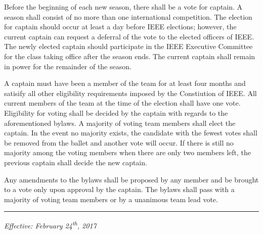 \documentclass[12pt]{constitution}
\begin{document}
\label{art:elect}

Before the beginning of each new season, there shall be a vote for captain. A season shall consist of no more than one international competition. The election for captain should occur at least a day before IEEE elections; however, the current captain can request a deferral of the vote to the elected officers of IEEE. The newly elected captain should participate in the IEEE Executive Committee for the class taking office after the season ends. The current captain shall remain in power for the remainder of the season.

A captain must have been a member of the team for at least four months and satisify all other eligibility requirements imposed by the Constiution of IEEE. All current members of the team at the time of the election shall have one vote. Eligibility for voting shall be decided by the captain with regards to the aforementioned bylaws. A majority of voting team members shall elect the captain. In the event no majority exists, the candidate with the fewest votes shall be removed from the ballet and another vote will occur. If there is still no majority among the voting members when there are only two members left, the previous captain shall decide the new captain.


\label{art:bylaw}

Any amendments to the bylaws shall be proposed by any member and be brought to a vote only upon approval by the captain. The bylaws shall pass with a majority of voting team members or by a unanimous team lead vote.

\vspace{12pt}
\hrule

\textit{Effective: February 24\textsuperscript{th}, 2017}


\setcounter{tocdepth}{1}
\end{document}
